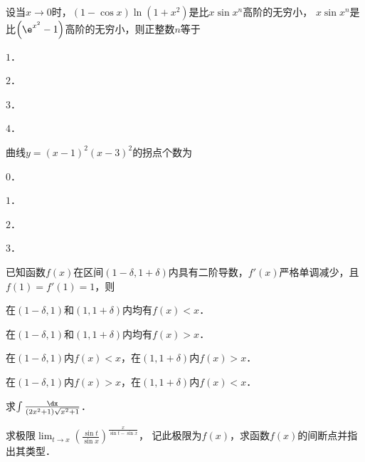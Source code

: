 \documentclass[plain,noanswer,medmath]{../../template/jnuexam}
\begin{document}
\begin{problem}
设当$x \to 0$时，$(1 - \cos x)\ln(1 + x^2)$是比$x\sin x^n$高阶的无穷小，
$x\sin x^n$是比$\left(\e^{x^2} - 1 \right)$高阶的无穷小，则正整数$n$等于\pickout{}
\begin{abcd}
\item $1$．
\item $2$．
\item $3$．
\item $4$．
\end{abcd}
\end{problem}


\begin{problem}
曲线$y = (x - 1)^2(x - 3)^2$的拐点个数为\pickout{}
\begin{abcd}
\item $0$．
\item $1$．
\item $2$．
\item $3$．
\end{abcd}
\end{problem}


\begin{problem}
已知函数$f(x)$在区间$(1 - \delta ,1 + \delta)$内具有二阶导数，$f'(x)$严格单调减少，且$f(1) = f'(1) = 1$，则\pickout{}
\begin{abcd}
\item 在$(1 - \delta ,1)$和$(1,1 + \delta)$内均有$f(x) < x$．
\item 在$(1 - \delta ,1)$和$(1,1 + \delta)$内均有$f(x) > x$．
\item 在$(1 - \delta ,1)$内$f(x) < x$，在$(1,1 + \delta)$内$f(x) > x$．
\item 在$(1 - \delta ,1)$内$f(x) > x$，在$(1,1 + \delta)$内$f(x) < x$．
\end{abcd}
\end{problem}





\begin{problem}
求$\int \frac{\dx}{(2x^2 + 1)\sqrt{x^2 + 1}}$．
\end{problem}



\begin{problem}
求极限$\lim_{t \to x} \left(\frac{\sin t}{\sin x} \right)^{\frac{x}{\sin t - \sin x}}$，
记此极限为$f(x)$，求函数$f(x)$的间断点并指出其类型．
\end{problem}
\end{document}
